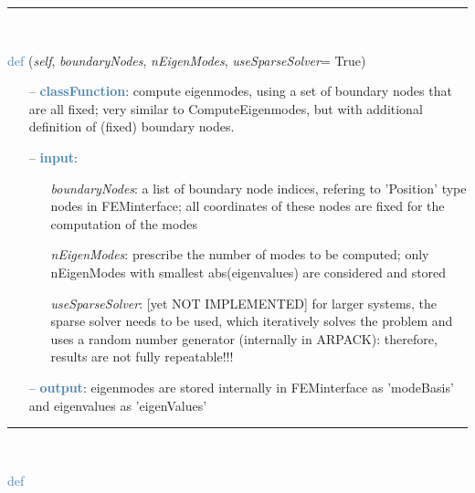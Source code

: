 \begin{itemize}[leftmargin=1.4cm]
\begin{itemize}[leftmargin=1.4cm]
\begin{itemize}[leftmargin=0.5cm]
\begin{itemize}[leftmargin=1.4cm]
\begin{itemize}[leftmargin=1.4cm]
\begin{itemize}[leftmargin=0.5cm]
%
\noindent\rule{8cm}{0.75pt}\vspace{1pt} \\ 
\begin{flushleft}
\noindent \textcolor{steelblue}{def {\bf {}}}\label{sec:FEM:FEMinterface:ComputeEigenModesWithBoundaryNodes}
({\it self}, {\it boundaryNodes}, {\it nEigenModes}, {\it useSparseSolver}= True)
\end{flushleft}
\setlength{\itemindent}{0.7cm}
\begin{itemize}[leftmargin=0.7cm]
  \item[--]  \textcolor{steelblue}{\bf classFunction}: compute eigenmodes, using a set of boundary nodes that are all fixed; very similar to ComputeEigenmodes, but with additional definition of (fixed) boundary nodes.  \item[--]  \textcolor{steelblue}{\bf input}: \vspace{-6pt}
  \begin{itemize}[leftmargin=1.2cm]
\setlength{\itemindent}{-0.7cm}
    \item[] {\it boundaryNodes}: a list of boundary node indices, refering to 'Position' type nodes in FEMinterface; all coordinates of these nodes are fixed for the computation of the modes
    \item[] {\it   nEigenModes}: prescribe the number of modes to be computed; only nEigenModes with smallest abs(eigenvalues) are considered and stored
    \item[] {\it   useSparseSolver}: [yet NOT IMPLEMENTED] for larger systems, the sparse solver needs to be used, which iteratively solves the problem and uses a random number generator (internally in ARPACK): therefore, results are not fully repeatable!!!
  \end{itemize}
  \item[--]  \textcolor{steelblue}{\bf output}: eigenmodes are stored internally in FEMinterface as 'modeBasis' and eigenvalues as 'eigenValues'\vspace{12pt}\end{itemize}
%
\noindent\rule{8cm}{0.75pt}\vspace{1pt} \\ 
\begin{flushleft}
\noindent \textcolor{steelblue}{def {\bf {}}}\label{sec:FEM:FEMinterface:ComputeHurtyCraigBamptonModes}

\end{flushleft}
\end{itemize}
\end{itemize}
\end{itemize}
\end{itemize}
\end{itemize}
\end{itemize}
